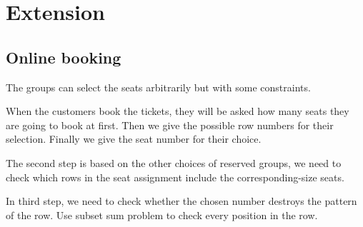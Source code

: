 
\section{Extension}

\subsection{Online booking} 

The groups can select the seats arbitrarily but with some constraints.

When the customers book the tickets, they will be asked how many seats they are going to book at first. Then we give the possible row numbers for their selection. Finally we give the seat number for their choice.

The second step is based on the other choices of reserved groups, we need to check which rows in the seat assignment include the corresponding-size seats.

In third step, we need to check whether the chosen number destroys the pattern of the row. Use subset sum problem to check every position in the row.











